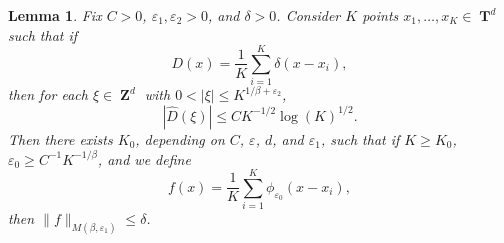 \documentclass[12pt,reqno]{article}
\numberwithin{equation}{section}
\DeclareMathOperator{\ZZ}{\mathbf{Z}}
\DeclareMathOperator{\TT}{\mathbf{T}}
\newtheorem{lemma}[theorem]{Lemma}
\begin{document}
\begin{lemma} \label{Lemma65493}
    Fix $C > 0$, $\varepsilon_1, \varepsilon_2 > 0$, and $\delta > 0$. Consider $K$ points $x_1, \dots, x_K \in \TT^d$ such that if
    \[ D(x) = \frac{1}{K} \sum_{i = 1}^K \delta(x - x_i), \]
    then for each $\xi \in \ZZ^d$ with $0 < |\xi| \leq K^{1/\beta + \varepsilon_2}$,
    \begin{equation} \label{equationFFOSOXPFFGHI}
        |\widehat{D}(\xi)| \leq C K^{-1/2} \log(K)^{1/2}.
    \end{equation}
    Then there exists $K_0$, depending on $C$, $\varepsilon$, $d$, and $\varepsilon_1$, such that if $K \geq K_0$, $\varepsilon_0 \geq C^{-1} K^{-1/\beta}$, and we define
    \[ f(x) = \frac{1}{K} \sum_{i = 1}^K \phi_{\varepsilon_0}(x - x_i), \]
    then $\| f \|_{M(\beta,\varepsilon_1)} \leq \delta$.
\end{lemma}
\end{document}
